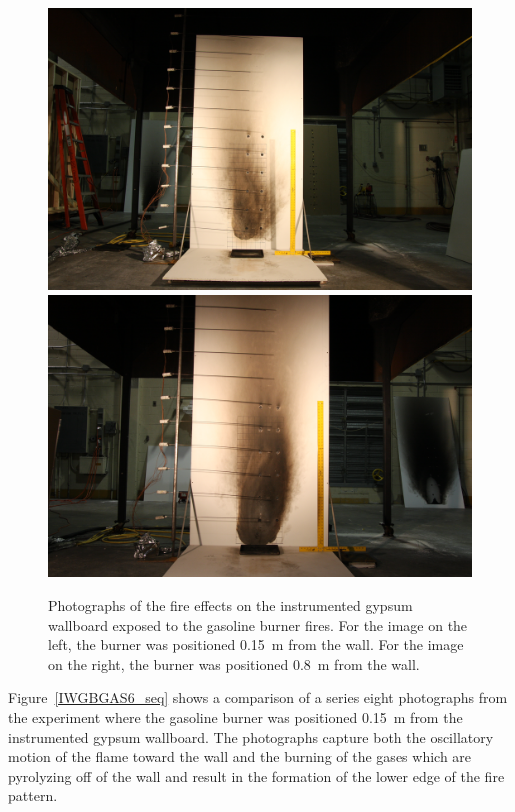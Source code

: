 \documentclass[twoside]{uocthesis}
\begin{document}
\begin{figure}[p]
	\centering
	\includegraphics[trim=18.0in 4.0in 21.0in 14.0in, clip=true, width=0.4\columnwidth]{../Figures/IWGB_Gas_0_15_pattern}
	\includegraphics[trim=18.0in 2.6in 18.0in 11.7in, clip=true, width=0.4\columnwidth]{../Figures/IWGB_Gas7_0_8m} \\
	\caption[Photographs of the fire effects on the instrumented gypsum wallboard exposed to the gasoline burner fires]{Photographs of the fire effects on the instrumented gypsum wallboard exposed to the gasoline burner fires. For the image on the left, the burner was positioned 0.15~m from the wall.  For the image on the right, the burner was positioned 0.8~m from the wall.}
	\label{IWGB_Gas_patterns}
\end{figure}

Figure~\ref{IWGBGAS6_seq} shows a comparison of a series eight photographs from the experiment where the gasoline burner was positioned 0.15~m from the instrumented gypsum wallboard.  The photographs capture both the oscillatory motion of the flame toward the wall and the burning of the gases which are pyrolyzing off of the wall and result in the formation of the lower edge of the fire pattern. 
\end{document}
